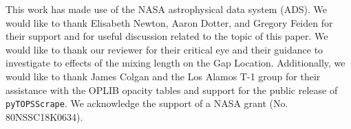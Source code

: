 \documentclass[twocolumn,linenumbers]{aastex631}
\begin{document}





\begin{acknowledgments}
	This work has made use of the NASA astrophysical data system (ADS). We
	would like to thank Elisabeth Newton, Aaron Dotter, and Gregory Feiden for
	their support and for useful discussion related to the topic of this paper.
	We would like to thank our reviewer for their critical eye and their
	guidance to investigate to effects of the mixing length on the Gap
	Location. Additionally, we would like to thank James Colgan and the Los
	Alamos T-1 group for their assistance with the OPLIB opacity tables and
	support for the public release of \texttt{pyTOPSScrape}. We acknowledge the
	support of a NASA grant (No. 80NSSC18K0634). 
\end{acknowledgments}



{}

\end{document}
